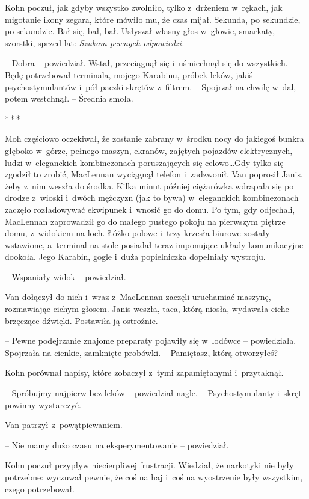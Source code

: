 \documentclass[oneside,polish,11pt,sfheadings]{mwbk}
\newcommand{\threeast}{\bigskip\par\centerline{*\,*\,*}\medskip\par}%
\begin{document}
Kohn poczuł, jak gdyby wszystko zwolniło, tylko z~drżeniem w~rękach, jak
migotanie ikony zegara, które mówiło mu, że czas mijał. Sekunda, po
sekundzie, po sekundzie. Bał się, bał, bał. Usłyszał własny głos w~głowie, smarkaty, szorstki, sprzed lat: \emph{Szukam pewnych
odpowiedzi.}

-- Dobra -- powiedział. Wstał, przeciągnął się i~uśmiechnął się do
wszystkich. -- Będę potrzebował terminala, mojego Karabinu, próbek leków,
jakiś psychostymulantów i~pół paczki skrętów z~filtrem. -- Spojrzał na
chwilę w~dal, potem westchnął. -- Średnia smoła.
  \threeast 

Moh częściowo oczekiwał, że zostanie zabrany w~środku nocy do jakiegoś
bunkra głęboko w~górze, pełnego maszyn, ekranów, zajętych pojazdów
elektrycznych, ludzi w~eleganckich kombinezonach poruszających się
celowo\ldots Gdy tylko się zgodził to zrobić, MacLennan wyciągnął telefon i~zadzwonił. Van poprosił Janis, żeby z~nim weszła do środka. Kilka minut
później ciężarówka wdrapała się po drodze z~wioski i~dwóch mężczyzn (jak
to bywa) w~eleganckich kombinezonach zaczęło rozładowywać ekwipunek i~wnosić go do domu. Po tym, gdy odjechali, MacLennan zaprowadził go do
małego pustego pokoju na pierwszym piętrze domu, z~widokiem na loch.
Łóżko polowe i~trzy krzesła biurowe zostały wstawione, a~terminal na
stole posiadał teraz imponujące układy komunikacyjne dookoła. Jego
Karabin, gogle i~duża popielniczka dopełniały wystroju.

-- Wspaniały widok -- powiedział.

Van dołączył do nich i~wraz z~MacLennan zaczęli uruchamiać maszynę,
rozmawiając cichym głosem. Janis weszła, taca, którą niosła, wydawała
ciche brzęczące dźwięki. Postawiła ją ostroźnie. 

-- Pewne podejrzanie
znajome preparaty pojawiły się w~lodówce -- powiedziała. Spojrzała na
cienkie, zamknięte probówki. -- Pamiętasz, którą otworzyłeś?

Kohn porównał napisy, które zobaczył z~tymi zapamiętanymi i~przytaknął.

-- Spróbujmy najpierw bez leków -- powiedział nagle. -- Psychostymulanty i~skręt powinny wystarczyć.

Van patrzył z~powątpiewaniem. 

-- Nie mamy dużo czasu na eksperymentowanie
-- powiedział.

Kohn poczuł przypływ niecierpliwej frustracji. Wiedział, że narkotyki
nie były potrzebne: wyczuwał pewnie, że coś na haj i~coś na wyostrzenie
były wszystkim, czego potrzebował.
\end{document}
